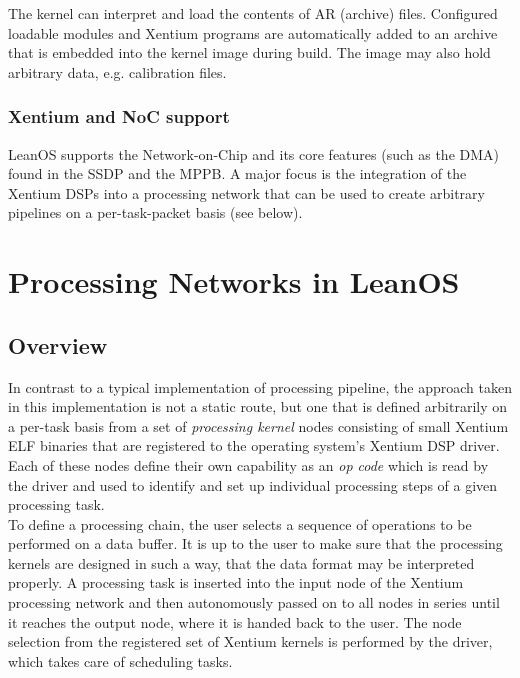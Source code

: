 The kernel can interpret and load the contents of AR (archive) files. Configured
loadable modules and Xentium programs are automatically added to an archive
that is embedded into the kernel image during build. The image may also hold
arbitrary data, e.g. calibration files.


\subsection {Xentium and NoC support}

LeanOS supports the Network-on-Chip and its core features (such as the DMA)
found in the \gls{SSDP} and the \gls{MPPB}. A major focus is the integration
of the \gls{Xentium} \glspl{DSP} into a processing network that can be used to
create arbitrary pipelines on a per-task-packet basis (see below).



\chapter{Processing Networks in LeanOS}

\section{Overview}

In contrast to a typical implementation of processing pipeline, the approach
taken in this implementation is not a static route, but one that is defined
arbitrarily on a per-task basis from a set of \emph{processing kernel} nodes
consisting of small \gls{Xentium} \gls{ELF} binaries that are registered to the
operating system's \gls{Xentium} \gls{DSP} driver. Each of these nodes define
their own capability as an \emph{op code} which is read by the driver and used
to identify and set up individual processing steps of a given processing task.
\\

\noindent
To define a processing chain, the user selects a sequence of operations to be
performed on a data buffer. It is up to the user to make sure that the
processing kernels are designed in such a way, that the data format may be
interpreted properly.
A processing task is inserted into the input node of the Xentium
processing network and then autonomously passed on to all nodes in series until
it reaches the output node, where it is handed back to the user. The node
selection from the registered set of \gls{Xentium} kernels is performed by the
driver, which takes care of scheduling tasks.
\\

